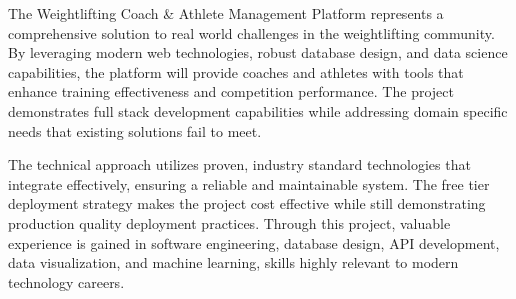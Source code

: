 \documentclass[11pt, oneside]{article}   	%
\begin{document}
The Weightlifting Coach \& Athlete Management Platform represents a comprehensive solution to real world challenges in the weightlifting community. By leveraging modern web technologies, robust database design, and data science capabilities, the platform will provide coaches and athletes with tools that enhance training effectiveness and competition performance. The project demonstrates full stack development capabilities while addressing domain specific needs that existing solutions fail to meet.

The technical approach utilizes proven, industry standard technologies that integrate effectively, ensuring a reliable and maintainable system. The free tier deployment strategy makes the project cost effective while still demonstrating production quality deployment practices. Through this project, valuable experience is gained in software engineering, database design, API development, data visualization, and machine learning, skills highly relevant to modern technology careers.
\end{document}

